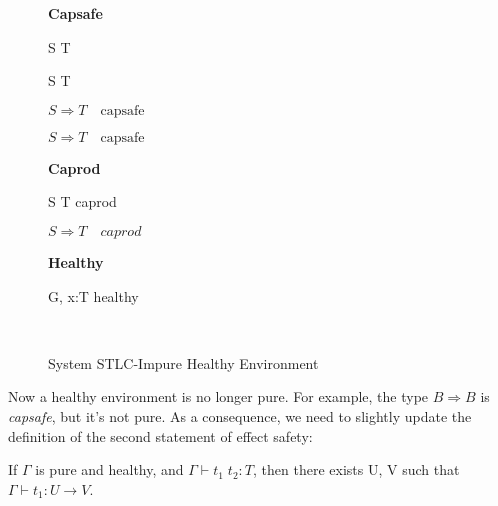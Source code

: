 \begin{figure}[h]
\begin{framed}

\setlength{\columnseprule}{0.4pt}
\begin{multicols}{2}

\textbf{Capsafe}


{ S \to T \quad {} }

{ S \to T \quad {} }

{ \colorbox{shade}{$S \Rightarrow T \quad \text{capsafe}$} }

{ \colorbox{shade}{$S \Rightarrow T \quad \text{capsafe}$} }

\columnbreak

\textbf{Caprod}


{ S \to T \quad caprod }

{ \colorbox{shade}{$S \Rightarrow T \quad caprod$} }

\textbf{Healthy}


{ G, \; x:T \quad healthy }

\hfill\\

\end{multicols}
\end{framed}

\caption{System STLC-Impure Healthy Environment}
\label{fig:stlc-impure-healthy-definition}
\end{figure}

Now a healthy environment is no longer pure. For example, the type
$B \Rightarrow B$ is \emph{capsafe}, but it's not pure. As a
consequence, we need to slightly update the definition of the second
statement of effect safety:

\begin{definition}
  If $\Gamma$ is pure and healthy, and $\Gamma \vdash t_1 \; t_2 : T$,
  then there exists U, V such that $\Gamma \vdash t_1 : U \to V$.
\end{definition}

